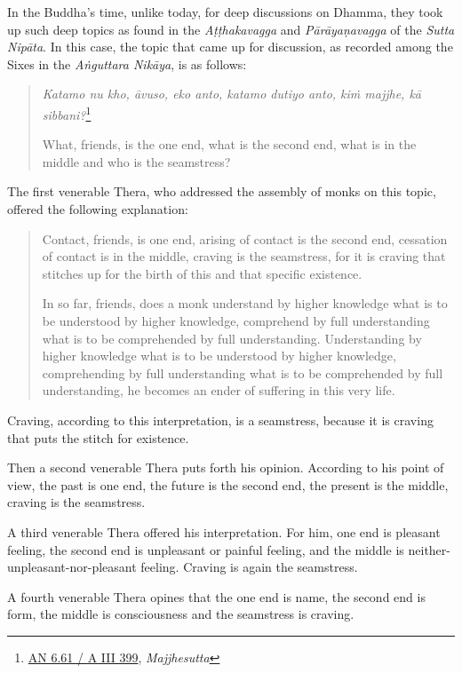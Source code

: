 In the Buddha's time, unlike today, for deep discussions on Dhamma, they took up such deep topics as found in the \emph{Aṭṭhakavagga} and \emph{Pārāyaṇavagga} of the \emph{Sutta Nipāta}. In this case, the topic that came up for discussion, as recorded among the Sixes in the \emph{Aṅguttara Nikāya}, is as follows:

\begin{quote}
\emph{Katamo nu kho, āvuso, eko anto, katamo dutiyo anto, kiṁ majjhe, kā sibbani?}\footnote{\href{https://suttacentral.net/an6.61/pli/ms}{AN 6.61 / A III 399}, \emph{Majjhesutta}}

What, friends, is the one end, what is the second end, what is in the middle and who is the seamstress?
\end{quote}

The first venerable Thera, who addressed the assembly of monks on this topic, offered the following explanation:

\begin{quote}
Contact, friends, is one end, arising of contact is the second end, cessation of contact is in the middle, craving is the seamstress, for it is craving that stitches up for the birth of this and that specific existence.

In so far, friends, does a monk understand by higher knowledge what is to be understood by higher knowledge, comprehend by full understanding what is to be comprehended by full understanding. Understanding by higher knowledge what is to be understood by higher knowledge, comprehending by full understanding what is to be comprehended by full understanding, he becomes an ender of suffering in this very life.
\end{quote}

Craving, according to this interpretation, is a seamstress, because it is craving that puts the stitch for existence.

Then a second venerable Thera puts forth his opinion. According to his point of view, the past is one end, the future is the second end, the present is the middle, craving is the seamstress.

A third venerable Thera offered his interpretation. For him, one end is pleasant feeling, the second end is unpleasant or painful feeling, and the middle is neither-unpleasant-nor-pleasant feeling. Craving is again the seamstress.

A fourth venerable Thera opines that the one end is name, the second end is form, the middle is consciousness and the seamstress is craving.

